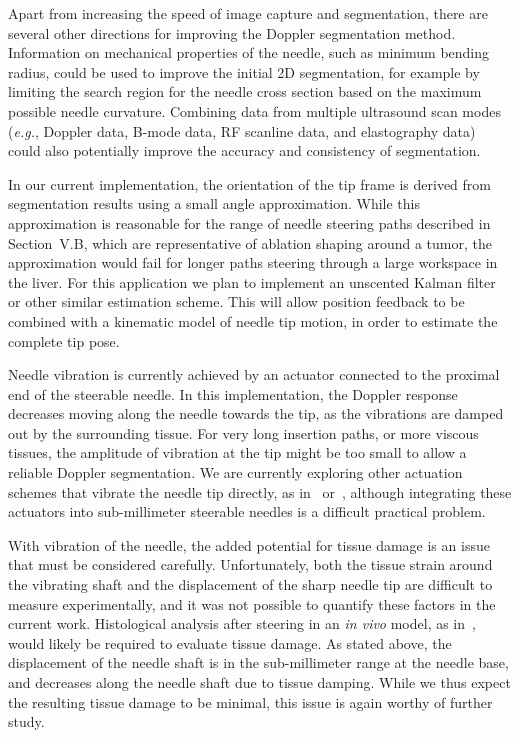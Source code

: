 Apart from increasing the speed of image capture and segmentation, there are several other directions for improving the Doppler segmentation method. Information on mechanical properties of the needle, such as minimum bending radius, could be used to improve the initial 2D segmentation, for example by limiting the search region for the needle cross section based on the maximum possible needle curvature. Combining data from multiple ultrasound scan modes (\textit{e.g.}, Doppler data, B-mode data, RF scanline data, and elastography data) could also potentially improve the accuracy and consistency of segmentation. 

In our current implementation, the orientation of the tip frame is derived from segmentation results using a small angle approximation. While this approximation is reasonable for the range of needle steering paths described in Section~V.B, which are representative of ablation shaping around a tumor, the approximation would fail for longer paths steering through a large workspace in the liver. For this application we plan to implement an unscented Kalman filter or other similar estimation scheme. This will allow position feedback to be combined with a kinematic model of needle tip motion, in order to estimate the complete tip pose.

Needle vibration is currently achieved by an actuator connected to the proximal end of the steerable needle. In this implementation, the Doppler response decreases moving along the needle towards the tip, as the vibrations are damped out by the surrounding tissue. For very long insertion paths, or more viscous tissues, the amplitude of vibration at the tip might be too small to allow a reliable Doppler segmentation. We are currently exploring other actuation schemes that vibrate the needle tip directly, as in~\cite{Harmat2006} or~\cite{McAleavey2003}, although integrating these actuators into sub-millimeter steerable needles is a difficult practical problem.

With vibration of the needle, the added potential for tissue damage is an issue that must be considered carefully. Unfortunately, both the tissue strain around the vibrating shaft and the displacement of the sharp needle tip are difficult to measure experimentally, and it was not possible to quantify these factors in the current work. Histological analysis after steering in an \textit{in vivo} model, as in~\cite{Majewicz2012}, would likely be required to evaluate tissue damage. As stated above, the displacement of the needle shaft is in the sub-millimeter range at the needle base, and decreases along the needle shaft due to tissue damping. While we thus expect the resulting tissue damage to be minimal, this issue is again worthy of further study.


